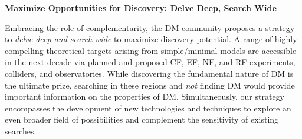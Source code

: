 \documentclass[nofootinbib]{article}
\begin{document}
\noindent
{\bf Maximize Opportunities for Discovery: Delve Deep, Search Wide}

Embracing the role of complementarity, the DM community proposes a strategy to \emph{delve deep and search wide} to maximize discovery potential. A range of highly compelling theoretical targets arising from simple/minimal models are accessible in the next decade via planned and proposed CF, EF, NF, and RF experiments, colliders, and observatories. %
While discovering the fundamental nature of DM is the ultimate prize, searching in these regions and \emph{not} finding DM would provide important information on the properties of DM. Simultaneously, our strategy encompasses the development of new technologies and techniques to explore an even broader field of possibilities and complement the sensitivity of existing searches.
\end{document}
